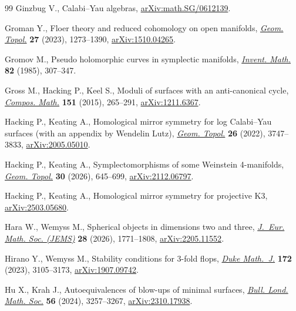 \begin{thebibliography}{99}
Ginzbug V., Calabi--{Y}au algebras,
 \href{http://arxiv.org/abs/math.SG/0612139}{arXiv:math.SG/0612139}.

Groman Y., Floer theory and reduced cohomology on open manifolds,
 \href{https://doi.org/10.2140/gt.2023.27.1273}{\textit{Geom. Topol.}}
 \textbf{27} (2023), 1273--1390,
 \href{http://arxiv.org/abs/1510.04265}{arXiv:1510.04265}.

Gromov M., Pseudo holomorphic curves in symplectic manifolds,
 \href{https://doi.org/10.1007/BF01388806}{\textit{Invent. Math.}} \textbf{82}
 (1985), 307--347.

Gross M., Hacking P., Keel S., Moduli of surfaces with an anti-canonical cycle,
 \href{https://doi.org/10.1112/S0010437X14007611}{\textit{Compos. Math.}}
 \textbf{151} (2015), 265--291,
 \href{http://arxiv.org/abs/1211.6367}{arXiv:1211.6367}.

Hacking P., Keating A., Homological mirror symmetry for log {C}alabi--{Y}au
 surfaces (with an appendix by {W}endelin {L}utz),
 \href{https://doi.org/10.2140/gt.2022.26.3747}{\textit{Geom. Topol.}}
 \textbf{26} (2022), 3747--3833,
 \href{http://arxiv.org/abs/2005.05010}{arXiv:2005.05010}.

Hacking P., Keating A., Symplectomorphisms of some {W}einstein 4-manifolds,
 \href{https://doi.org/10.2140/gt.2026.30.645}{\textit{Geom. Topol.}}
 \textbf{30} (2026), 645--699,
 \href{http://arxiv.org/abs/2112.06797}{arXiv:2112.06797}.

Hacking P., Keating A., Homological mirror symmetry for projective {K}3,
 \href{http://arxiv.org/abs/2503.05680}{arXiv:2503.05680}.

Hara W., Wemyss M., Spherical objects in dimensions two and three,
 \href{https://doi.org/10.4171/jems/1504}{\textit{J.~Eur. Math. Soc. (JEMS)}}
 \textbf{28} (2026), 1771--1808,
 \href{http://arxiv.org/abs/2205.11552}{arXiv:2205.11552}.

Hirano Y., Wemyss M., Stability conditions for 3-fold flops,
 \href{https://doi.org/10.1215/00127094-2022-0097}{\textit{Duke Math.~J.}}
 \textbf{172} (2023), 3105--3173,
 \href{http://arxiv.org/abs/1907.09742}{arXiv:1907.09742}.

Hu X., Krah J., Autoequivalences of blow-ups of minimal surfaces,
 \href{https://doi.org/10.1112/blms.13131}{\textit{Bull. Lond. Math. Soc.}}
 \textbf{56} (2024), 3257--3267,
 \href{http://arxiv.org/abs/2310.17938}{arXiv:2310.17938}.


\end{thebibliography}
